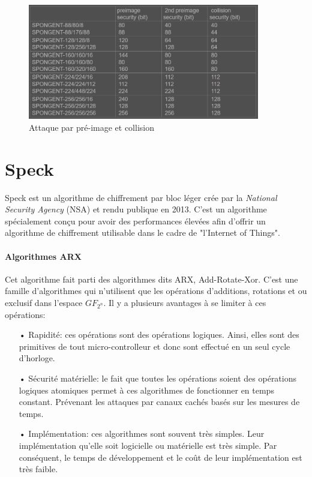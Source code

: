 		\begin{figure}[!h]
			\centering
			\includegraphics[width=0.9\textwidth, height=0.3\textheight]{imgs/Spongent/attaquePreImage.png}
			\caption{Attaque par pré-image et collision}
			\label{attaquePreImage}
		\end{figure}

\newpage
\part{Speck}

		Speck est un algorithme de chiffrement par bloc léger crée par la
	\textit{National Security Agency} (NSA) et rendu
	publique en 2013. C'est un algorithme spécialement conçu pour avoir des performances
	élevées afin d'offrir un algorithme de chiffrement utilisable dans le cadre de
	"l'Internet of Things".

	\subsection{Algorithmes ARX}

			Cet algorithme fait parti des algorithmes dits ARX, Add-Rotate-Xor. C'est une famille
		d'algorithmes qui n'utilisent que les opérations d'additions, rotations et ou exclusif
		dans l'espace $GF_{2^n}$. Il y a plusieurs avantages à se limiter à ces opérations:

		\begin{enumerate}
		\item[•] Rapidité: ces opérations sont des opérations logiques. Ainsi, elles sont
			des primitives de tout micro-controlleur et donc sont effectué en un seul
			cycle d'horloge.
		\item[•] Sécurité matérielle: le fait que toutes les opérations soient des opérations
			logiques atomiques permet à ces algorithmes de fonctionner en temps constant.
			Prévenant les attaques par canaux cachés basés sur les mesures de temps.
		\item[•] Implémentation: ces algorithmes sont souvent très simples. Leur implémentation
			qu'elle soit logicielle ou matérielle est très simple. Par conséquent, le
			temps de développement et le coût de leur implémentation est très faible.
		\end{enumerate}

